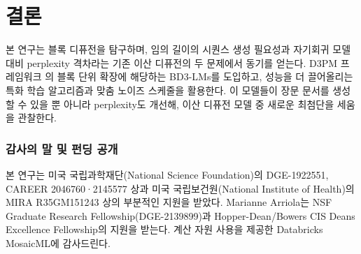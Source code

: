 \documentclass{article} %
\def\algos{BD3-LMs}
\begin{document}
\section{결론}
본 연구는 블록 디퓨전을 탐구하며, 임의 길이의 시퀀스 생성 필요성과 자기회귀 모델 대비 perplexity 격차라는 기존 이산 디퓨전의 두 문제에서 동기를 얻는다. D3PM 프레임워크 \citep{austin2021structured}의 블록 단위 확장에 해당하는 \algos{}를 도입하고, 성능을 더 끌어올리는 특화 학습 알고리즘과 맞춤 노이즈 스케줄을 활용한다. 이 모델들이 장문 문서를 생성할 수 있을 뿐 아니라 perplexity도 개선해, 이산 디퓨전 모델 중 새로운 최첨단을 세움을 관찰한다.

\subsubsection*{감사의 말 및 펀딩 공개}
본 연구는 미국 국립과학재단(National Science Foundation)의 DGE-1922551, CAREER 2046760·2145577 상과 미국 국립보건원(National Institute of Health)의 MIRA R35GM151243 상의 부분적인 지원을 받았다. Marianne Arriola는 NSF Graduate Research Fellowship(DGE-2139899)과 Hopper-Dean/Bowers CIS Deans Excellence Fellowship의 지원을 받는다. 계산 자원 사용을 제공한 Databricks MosaicML에 감사드린다.





\newpage

\appendix
\setcounter{tocdepth}{2}
\tableofcontents
\allowdisplaybreaks
\end{document}
